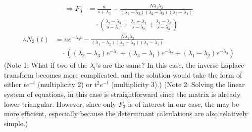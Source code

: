 \begin{align*}
    \Rightarrow F_3
    &= \frac{n}{s + \lambda_3} - \frac{N\lambda_1 \lambda_2}{(\lambda_1 - \lambda_2) (\lambda_2 - \lambda_3) (\lambda_3 - \lambda_1)} \\
    &\quad\cdot \left(
        \frac{\lambda_2 - \lambda_3}{s - \lambda_1} +
        \frac{\lambda_3 - \lambda_1}{s - \lambda_2} +
        \frac{\lambda_1 - \lambda_2}{s - \lambda_3}
    \right)
\end{align*}
\begin{align*}
    \therefore N_3(t)
    &= ne^{-\lambda_3 t} - \frac{N\lambda_1 \lambda_2}{(\lambda_1 - \lambda_2) (\lambda_2 - \lambda_3) (\lambda_3 - \lambda_1)} \\
    &\quad\cdot \left(
        (\lambda_2 - \lambda_3) e^{-\lambda_1} +
        (\lambda_3 - \lambda_1) e^{-\lambda_2} +
        (\lambda_1 - \lambda_2) e^{-\lambda_3}
    \right)
\end{align*}
(Note 1: What if two of the $\lambda_i$'s are the same?
In this case, the inverse Laplace transform becomes more complicated,
and the solution would take the form of
either $te^{-t}$ (multiplicity 2) or $t^2 e^{-t}$ (multiplicity 3).)
(Note 2: Solving the linear system of equations, in this case is straightforward
since the matrix is already lower triangular.
However, since only $F_3$ is of interest in our case, the
may be more efficient, especially because the determinant calculations are also relatively simple.)